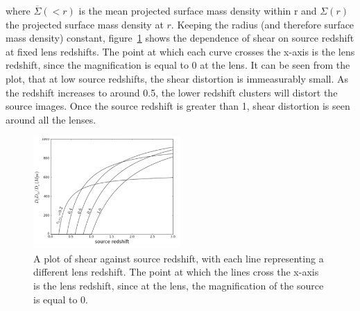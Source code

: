 	where $\overline{\Sigma}(<r)$ is the mean projected surface mass density within r and $\Sigma(r)$ the projected surface mass density at $r$. Keeping the radius (and therefore surface mass density) constant, figure~\ref{fig:shear_as_a_function_of_source_redshift} shows the dependence of shear on source redshift at fixed lens redshifts. The point at which each curve crosses the x-axis is the lens redshift, since the magnification is equal to 0 at the lens. It can be seen from the plot, that at low source redshifts, the shear distortion is immeasurably small. As the redshift increases to around 0.5, the lower redshift clusters will distort the source images. Once the source redshift is greater than 1, shear distortion is seen around all the lenses\cite{Constraining_source_redshift_distributions}.
	\begin{figure}[!htb]
		\centering
			\includegraphics[width=0.5\textwidth]{../Images/Shear_as_a_function_of_source_redshift.png}
		\caption[Shear as a function of source redshift]{\cite{Constraining_source_redshift_distributions}A plot of shear against source redshift, with each line representing a different lens redshift. The point at which the lines cross the x-axis is the lens redshift, since at the lens, the magnification of the source is equal to 0.\label{fig:shear_as_a_function_of_source_redshift}}
	\end{figure}

